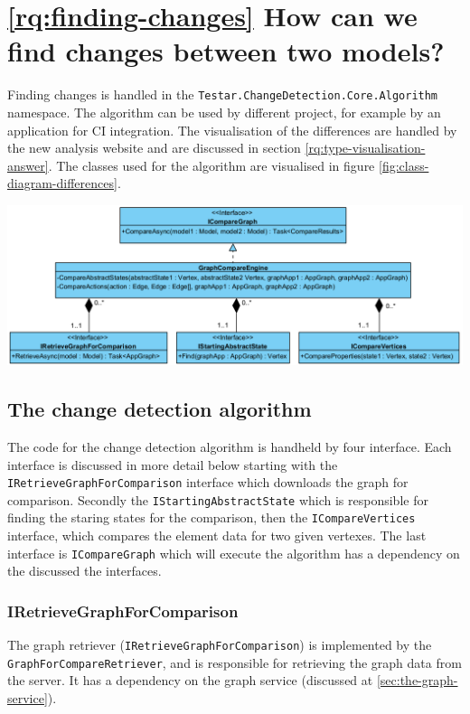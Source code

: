 \section{\ref{rq:finding-changes} How can we find changes between two models?}


Finding changes is handled in the \verb|Testar.ChangeDetection.Core.Algorithm| namespace. The algorithm can be used by different project, for example by an application for CI integration. The visualisation of the differences are handled by the new analysis website and are discussed in section \ref{rq:type-visualisation-answer}. The classes used for the algorithm are visualised in figure \ref{fig:class-diagram-differences}. 

\begingroup
\captionsetup{type=figure}
\includegraphics[scale=0.65]{images/4-UML-Differences.png}
\label{fig:class-diagram-differences}
\endgroup

\subsection{The change detection algorithm}

The code for the change detection algorithm is handheld by four interface. Each interface is discussed in more detail below starting with the \verb|IRetrieveGraphForComparison| interface which downloads the graph for comparison. Secondly the \verb|IStartingAbstractState| which is responsible for finding the staring states for the comparison, then the \verb|ICompareVertices| interface, which compares the element data for two given vertexes. The last interface is \verb|ICompareGraph| which will execute the algorithm has a dependency on the discussed the interfaces. 


\subsubsection{IRetrieveGraphForComparison}
The graph retriever (\verb|IRetrieveGraphForComparison|) is implemented by the \verb|GraphForCompareRetriever|, and is responsible for retrieving the graph data from the server. It has a dependency on the graph service (discussed at \ref{sec:the-graph-service}). 


